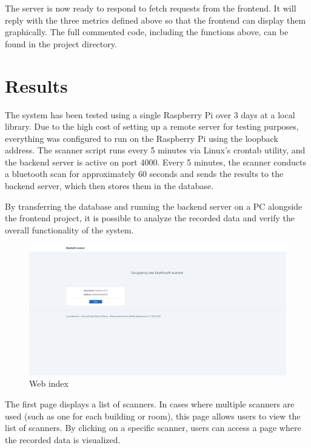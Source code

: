\documentclass[a4paper, 11pt]{article}
\begin{document}
The server is now ready to respond to fetch requests from the frontend. It will reply with the three metrics defined above so that the frontend can display them graphically. The full commented code, including the functions above, can be found in the project directory.

\section{Results}
The system has been tested using a single Raspberry Pi over 3 days at a local library. Due to the high cost of setting up a remote server for testing purposes, everything was configured to run on the Raspberry Pi using the loopback address. The scanner script runs every 5 minutes via Linux's crontab utility, and the backend server is active on port 4000. Every 5 minutes, the scanner conducts a bluetooth scan for approximately 60 seconds and sends the results to the backend server, which then stores them in the database.

By transferring the database and running the backend server on a PC alongside the frontend project, it is possible to analyze the recorded data and verify the overall functionality of the system.

\begin{figure}[H]
    \centering
    \includegraphics[width=1\linewidth]{images/DeviceIndexScreenshot.png}
    \caption{Web index}
    \label{fig:web-index}
\end{figure}

The first page displays a list of scanners. In cases where multiple scanners are used (such as one for each building or room), this page allows users to view the list of scanners. By clicking on a specific scanner, users can access a page where the recorded data is visualized.
\end{document}
